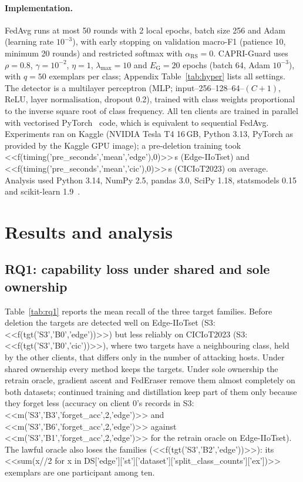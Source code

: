 \documentclass[pdflatex,sn-mathphys-num,iicol]{sn-jnl}
\begin{document}
\paragraph{Implementation.} FedAvg runs at most 50 rounds with 2 local epochs, batch size 256 and Adam (learning rate $10^{-3}$), with early stopping on validation macro-F1 (patience 10, minimum 20 rounds) and restricted softmax with $\alpha_{\mathrm{RS}}=0$. CAPRI-Guard uses $\rho=0.8$, $\gamma=10^{-2}$, $\eta=1$, $\lambda_{\max}=10$ and $E_{\mathrm{G}}=20$ epochs (batch 64, Adam $10^{-3}$), with $q=50$ exemplars per class; Appendix Table~\ref{tab:hyper} lists all settings. The detector is a multilayer perceptron (MLP; input--256--128--64--$(C+1)$, ReLU, layer normalisation, dropout 0.2), trained with class weights proportional to the inverse square root of class frequency. All ten clients are trained in parallel with vectorised PyTorch~\cite{paszke2019} code, which is equivalent to sequential FedAvg. Experiments ran on Kaggle (NVIDIA Tesla T4 16\,GB, Python 3.13, PyTorch as provided by the Kaggle GPU image); a pre-deletion training took <<f(timing('pre_seconds','mean','edge'),0)>>\,s (Edge-IIoTset) and <<f(timing('pre_seconds','mean','cic'),0)>>\,s (CICIoT2023) on average. Analysis used Python 3.14, NumPy 2.5, pandas 3.0, SciPy 1.18, statsmodels 0.15~\cite{seabold2010} and scikit-learn 1.9~\cite{pedregosa2011}.



\section{Results and analysis}\label{sec:results}

\subsection{RQ1: capability loss under shared and sole ownership}\label{sec:res-rq1}

Table~\ref{tab:rq1} reports the mean recall of the three target families. Before deletion the targets are detected well on Edge-IIoTset (S3: <<f(tgt('S3','B0','edge'))>>) but less reliably on CICIoT2023 (S3: <<f(tgt('S3','B0','cic'))>>), where two targets have a neighbouring class, held by the other clients, that differs only in the number of attacking hosts. Under shared ownership every method keeps the targets. Under sole ownership the retrain oracle, gradient ascent and FedEraser remove them almost completely on both datasets; continued training and distillation keep part of them only because they forget less (accuracy on client 0's records in S3: <<m('S3','B3','forget_acc',2,'edge')>> and <<m('S3','B6','forget_acc',2,'edge')>> against <<m('S3','B1','forget_acc',2,'edge')>> for the retrain oracle on Edge-IIoTset). The lawful oracle also loses the families (<<f(tgt('S3','B2','edge'))>>): its <<sum(x//2 for x in DS['edge']['st']['dataset']['split_class_counts']['ex'])>> exemplars are one participant among ten.
\end{document}
